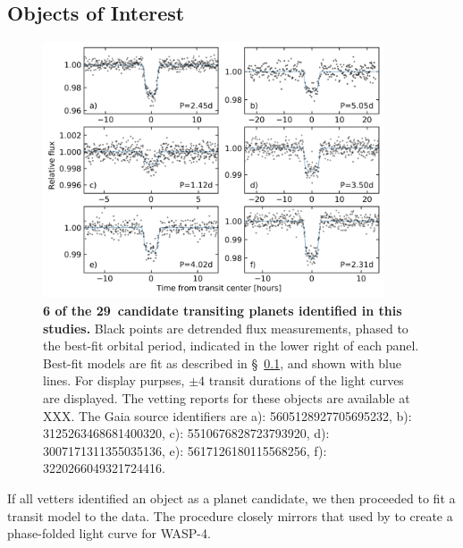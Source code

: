 \documentclass[12pt,twocolumn,tighten]{aastex62}
\newcommand{\numberpcs}{29\ }  %
\begin{document}
\subsection{Objects of Interest}
\label{subsec:ctois}

\begin{figure}[t]
	\begin{center}
		\leavevmode
		\includegraphics[width=0.9\textwidth]{quilt_PCs.png}
	\end{center}
	\vspace{-0.2cm}
	\caption{
    {\bf 6 of the \numberpcs candidate transiting planets identified
    in this studies.}
	Black points are detrended flux measurements, phased to the
	best-fit orbital period, indicated in the lower right of each panel.
	Best-fit models are fit as described in \S~\ref{subsec:ctois}, and
	shown with blue lines.
	For display purpses, $\pm 4$ transit durations of the
	light curves are displayed.
	The vetting reports for these objects are available at XXX.	%
	The Gaia source identifiers are
	a): 5605128927705695232, 
	b): 3125263468681400320, 
	c): 5510676828723793920, 
	d): 3007171311355035136, 
	e): 5617126180115568256, 
	f): 3220266049321724416.   
	\label{fig:ctoi_quilt}
	}
\end{figure}

If all vetters identified an object as a planet candidate, we then
proceeded to fit a transit model to the data.  The procedure closely
mirrors that used by \citet{bouma_wasp-4b_2019} to create a
phase-folded light curve for WASP-4.
\end{document}
